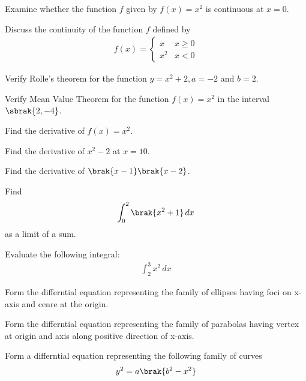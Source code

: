%
%
\item Examine whether the function $f$ given by $f(x) = x^2$ is continuous at $x = 0$.
%
\item Discuss the continuity of the function $f$ defined by 
%
\begin{align}
f(x)  = 
\begin{cases}
x & x \ge 0
\\
x^2 & x < 0
\end{cases}
\end{align}
%
\item Verify Rolle's theorem for the function $y = x^2+2, a = -2$ and $b = 2$.
\item Verify Mean Value Theorem for the function $f(x) = x^2$ in the interval $\sbrak{2,-4}$.
\item Find the derivative of $f(x) = x^2$.
\item Find the derivative of $ x^2 - 2$ at $x = 10$.
\item Find the derivative of $ \brak{x-1} \brak{x-2}$.
%
%
\item Find 
\begin{align}
\int_{0}^{2} \brak{x^2+1}\,dx
\end{align}
%
as a limit of a sum.
\item Evaluate the following integral:
%
\begin{align}
\int_{2}^{3}x^2 \,dx
\end{align}
%
\item Form the differntial equation representing the family of ellipses having foci on x-axis and cenre at the origin.
%
\item Form the differntial equation representing the family of parabolas having vertex at origin and axis along positive direction of x-axis.
\item Form a differntial equation representing the following family of curves
%
\begin{align}
y^2 = a\brak{b^2-x^2}
\end{align}
